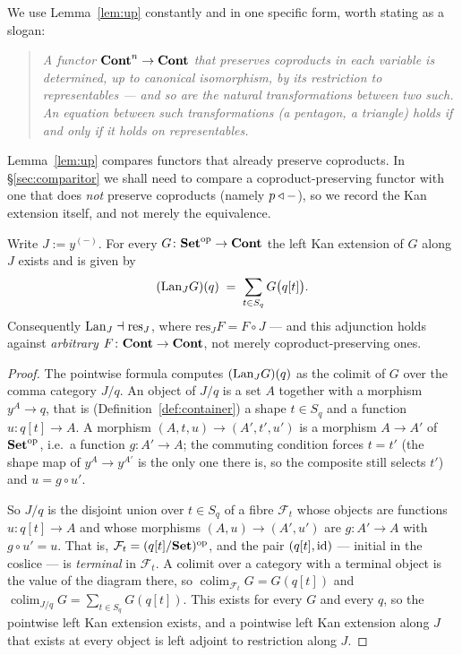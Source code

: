 We use Lemma~\ref{lem:up} constantly and in one specific form, worth stating as
a slogan:

\begin{quote}
\emph{A functor $\mathbf{Cont}^n\to\mathbf{Cont}$ that preserves coproducts in each variable is
determined, up to canonical isomorphism, by its restriction to representables ---
and so are the natural transformations between two such. An equation between
such transformations (a pentagon, a triangle) holds if and only if it holds on
representables.}
\end{quote}

Lemma~\ref{lem:up} compares functors that already preserve coproducts. In
§\ref{sec:comparitor} we shall need to compare a coproduct-preserving functor
with one that does \emph{not} preserve coproducts (namely $p\mathbin{\triangleleft}-$), so we
record the Kan extension itself, and not merely the equivalence.

\begin{Lemma}
\label{lem:lan}
Write $J:=y^{(-)}$. For every $G\colon\mathbf{Set}^{\mathrm{op}}\to\mathbf{Cont}$ the left Kan
extension of $G$ along $J$ exists and is given by
\[
   (\mathrm{Lan}_J G)(q)\;=\;\sum_{t\in S_q} G\bigl(q[t]\bigr).
\]
Consequently $\mathrm{Lan}_J\dashv\mathrm{res}_J$, where
$\mathrm{res}_J F=F\circ J$ --- and this adjunction holds against \emph{arbitrary}
$F\colon\mathbf{Cont}\to\mathbf{Cont}$, not merely coproduct-preserving ones.
\end{Lemma}

\begin{proof}
The pointwise formula computes $(\mathrm{Lan}_J G)(q)$ as the colimit of $G$ over the
comma category $J/q$. An object of $J/q$ is a set $A$ together with a morphism
$y^A\to q$, that is (Definition~\ref{def:container}) a shape $t\in S_q$ and a
function $u\colon q[t]\to A$. A morphism $(A,t,u)\to(A',t',u')$ is a morphism
$A\to A'$ of $\mathbf{Set}^{\mathrm{op}}$, i.e.\ a function $g\colon A'\to A$; the
commuting condition forces $t=t'$ (the shape map of $y^A\to y^{A'}$ is the only
one there is, so the composite still selects $t'$) and $u=g\circ u'$.

So $J/q$ is the disjoint union over $t\in S_q$ of a fibre $\mathcal F_t$ whose
objects are functions $u\colon q[t]\to A$ and whose morphisms
$(A,u)\to(A',u')$ are $g\colon A'\to A$ with $g\circ u'=u$. That is,
$\mathcal F_t=(q[t]/\mathbf{Set})^{\mathrm{op}}$, and the pair $(q[t],\mathrm{id})$ --- initial in
the coslice --- is \emph{terminal} in $\mathcal F_t$. A colimit over a category
with a terminal object is the value of the diagram there, so
$\operatorname{colim}_{\mathcal F_t}G=G(q[t])$ and
$\operatorname{colim}_{J/q}G=\sum_{t\in S_q}G(q[t])$. This exists for every $G$
and every $q$, so the pointwise left Kan extension exists, and a pointwise left
Kan extension along $J$ that exists at every object is left adjoint to
restriction along $J$.
\end{proof}

